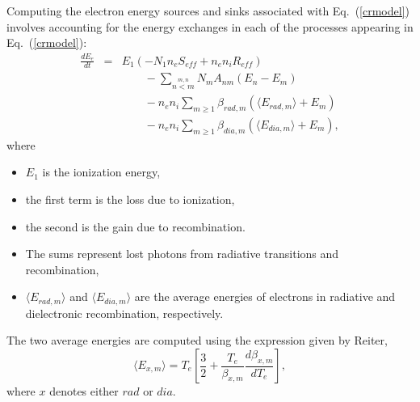 \documentclass[12pt]{report}
\begin{document}
Computing the electron energy sources and sinks associated with 
Eq.~(\ref{crmodel}) involves accounting for the energy exchanges
in each of the processes appearing in Eq.~(\ref{crmodel}):
\begin{eqnarray}
\frac{d E_{e}}{d t} & = & E_{1} \left( - N_{1} n_{e} S_{eff} + 
n_{e} n_{i} R_{eff}  \right) \nonumber \\
& & \qquad - \sum_{\stackrel{m,n}{\scriptstyle n < m}} N_{m} A_{nm}
\left( E_{n} - E_{m} \right) \nonumber \\
& & \qquad - n_{e} n_{i} 
\sum_{m \geq 1} \beta_{rad,m} \left( \langle E_{rad,m} \rangle + E_{m}
\right) \nonumber \\
& & \qquad - n_{e} n_{i} 
\sum_{m \geq 1} \beta_{dia,m} \left( \langle E_{dia,m} \rangle + E_{m}
\right),
\label{creloss}
\end{eqnarray}
where
\begin{itemize}
  \item $E_{1}$ is the ionization energy,
  \item the first term is the loss due to ionization,
  \item the second is the gain due to recombination. 
  \item The sums represent lost photons from radiative transitions and
recombination,
  \item $\langle E_{rad,m} \rangle$ and 
$\langle E_{dia,m} \rangle$ are the average energies of electrons in
radiative and dielectronic recombination, respectively.
\end{itemize}
The two average energies are computed using 
the expression given by Reiter\cite{Reit93},
\begin{equation}
\langle E_{x,m} \rangle  =  T_{e} \left[ \frac{3}{2} 
   + \frac{T_{e}}{\beta_{x,m}} \frac{ d \beta_{x,m}}{d T_{e}} \right],
\end{equation}
where $x$ denotes either $rad$ or $dia$.
\end{document}
